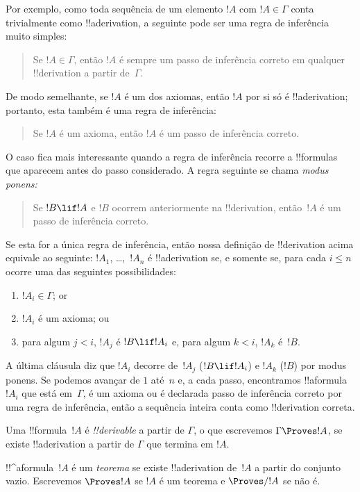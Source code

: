 \documentclass[../../../include/open-logic-section]{subfiles}
\begin{document}
Por exemplo, como toda sequência de um elemento $!A$ com $!A \in \Gamma$
conta trivialmente como !!a{derivation}, a seguinte pode ser uma regra de
inferência muito simples:
\begin{quote}
  Se $!A \in \Gamma$, então $!A$ é sempre um passo de inferência correto
  em qualquer !!{derivation} a partir de~$\Gamma$.
\end{quote}
De modo semelhante, se $!A$ é um dos axiomas, então $!A$ por si só é
!!a{derivation}; portanto, esta também é uma regra de inferência:
\begin{quote}
  Se $!A$ é um axioma, então $!A$ é um passo de inferência correto.
\end{quote}
O caso fica mais interessante quando a regra de inferência recorre a
!!{formula}s que aparecem antes do passo considerado. A regra seguinte
se chama \emph{modus ponens:}
\begin{quote}
  Se $!B \lif !A$ e $!B$ ocorrem anteriormente na !!{derivation},
  então~$!A$ é um passo de inferência correto.
\end{quote}
Se esta for a única regra de inferência, então nossa definição de
!!{derivation} acima equivale ao seguinte: $!A_1$, \dots,~$!A_n$ é
!!a{derivation} se, e somente se, para cada $i \le n$ ocorre uma das
seguintes possibilidades:
\begin{enumerate}
\item $!A_i \in \Gamma$; or
\item $!A_i$ é um axioma; ou
\item para algum $j < i$, $!A_j$ é $!B \lif !A_i$ e, para algum $k < i$,
  $!A_k$ é~$!B$.
\end{enumerate}
A última cláusula diz que $!A_i$ decorre de~$!A_j$ ($!B \lif !A_i$) e
$!A_k$ ($!B$) por modus ponens. Se podemos avançar de $1$ até~$n$ e,
a cada passo, encontramos !!a{formula}~$!A_i$ que está em~$\Gamma$, é um
axioma ou é declarada passo de inferência correto por uma regra de
inferência, então a sequência inteira conta como !!{derivation} correta.

\begin{defn}[!!^{derivability}]
Uma !!{formula}~$!A$ é \emph{!!{derivable}} a partir de $\Gamma$, o que
escrevemos $\Gamma \Proves !A$, se existe !!a{derivation} a partir de
$\Gamma$ que termina em $!A$.
\end{defn}

\begin{defn}[Teoremas]
!!^a{formula}~$!A$ é um \emph{teorema} se existe !!a{derivation}
de~$!A$ a partir do conjunto vazio. Escrevemos $\Proves !A$ se $!A$ é
um teorema e $\Proves/ !A$ se não é.
\end{defn}
\end{document}
